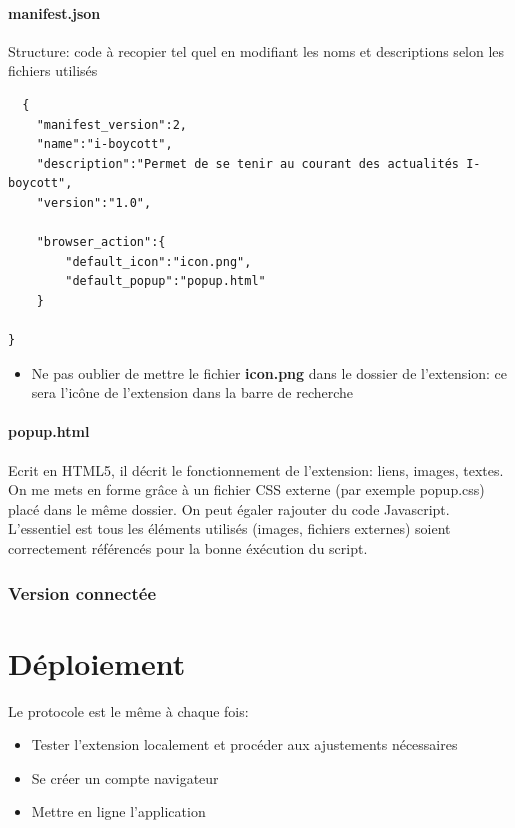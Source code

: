 \documentclass[a4paper,10pt]{report}
\begin{document}
\subsection{manifest.json}
Structure: code à recopier tel quel en modifiant les noms et descriptions selon les fichiers utilisés
\begin{verbatim}
  {
	"manifest_version":2,
	"name":"i-boycott", 								
	"description":"Permet de se tenir au courant des actualités I-boycott",		
	"version":"1.0",								

	"browser_action":{								
		"default_icon":"icon.png",						
		"default_popup":"popup.html"						
	}

}
\end{verbatim}
\begin{itemize}
 \item Ne pas oublier de mettre le fichier \textbf{icon.png} dans le dossier de l'extension: ce sera l'icône de l'extension dans la barre de recherche
\end{itemize}

\subsection{popup.html}
Ecrit en HTML5, il décrit le fonctionnement de l'extension: liens, images, textes. On me mets en forme grâce à un fichier CSS externe (par exemple popup.css) placé dans le même dossier.
On peut égaler rajouter du code Javascript. L'essentiel est tous les éléments utilisés (images, fichiers externes) soient correctement référencés pour la bonne éxécution du script.

\section{Version connectée}


\part{Déploiement}

Le protocole est le même à chaque fois:
\begin{itemize}
 \item Tester l'extension localement et procéder aux ajustements nécessaires
 \item Se créer un compte navigateur
 \item Mettre en ligne l'application
\end{itemize}
\end{document}
